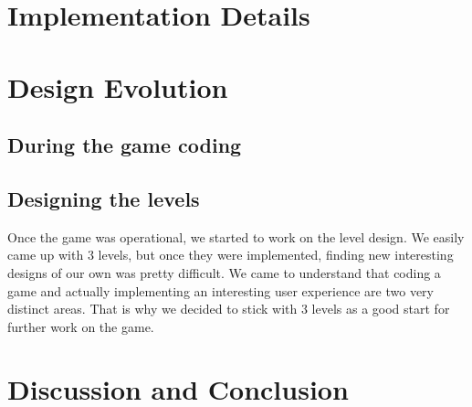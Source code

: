 \documentclass{chi-ext}
\begin{document}
\section{Implementation Details}


\section{Design Evolution}
\subsection{During the game coding}


\subsection{Designing the levels}
Once the game was operational, we started to work on the level design. We easily came up with 3 levels, but once they were implemented, finding new interesting designs of our own was pretty difficult. We came to understand that coding a game and actually implementing an interesting user experience are two very distinct areas. That is why we decided to stick with 3 levels as a good start for further work on the game.

\section{Discussion and Conclusion}

\balance


\end{document}
